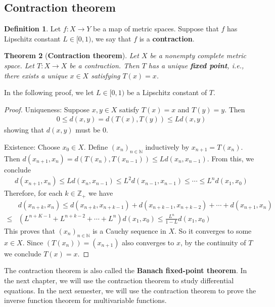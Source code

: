 \documentclass[12pt,b5paper,notitlepage]{article}
\theoremstyle{definition}
\newtheorem{df}{Definition}[section]
\theoremstyle{plain}
\newtheorem{thm}[df]{Theorem}
\newcommand{\Nbb}{\mathbb N}
\newcommand{\Zbb}{\mathbb Z}
\numberwithin{equation}{section}
\begin{document}
\subsection{Contraction theorem}



\begin{df}
Let $f:X\rightarrow Y$ be a map of metric spaces. Suppose that $f$ has Lipschitz constant $L\in[0,1)$, we say that $f$ is a \textbf{contraction}.
\end{df}


\begin{thm}[\textbf{Contraction theorem}] \label{lb555}
Let $X$ be a nonempty complete metric space. Let $T:X\rightarrow X$ be a contraction. Then $T$ has a unique \textbf{fixed point},  i.e., there exists a unique $x\in X$ satisfying $T(x)=x$. 
\end{thm}

In the following proof, we let $L\in[0,1)$ be a Lipschitz constant of $T$.

\begin{proof}
Uniqueness: Suppose $x,y\in X$ satisfy $T(x)=x$ and $T(y)=y$. Then
\begin{align*}
0\leq d(x,y)=d(T(x),T(y))\leq Ld(x,y)
\end{align*}
showing that $d(x,y)$ must be $0$.

Existence: Choose $x_0\in X$. Define $(x_n)_{n\in\Nbb}$ inductively by $x_{n+1}=T(x_n)$. Then $d(x_{n+1},x_n)=d(T(x_n),T(x_{n-1}))\leq L d(x_n,x_{n-1})$. From this, we conclude
\begin{align*}
d(x_{n+1},x_n)\leq Ld(x_n,x_{n-1})\leq L^2 d(x_{n-1},x_{n-1})\leq\cdots\leq L^n d(x_1,x_0)
\end{align*}
Therefore, for each $k\in\Zbb_+$ we have
\begin{align*}
&d(x_{n+k},x_n)\leq d(x_{n+k},x_{n+k-1})+d(x_{n+k-1},x_{n+k-2})+\cdots+d(x_{n+1},x_n)\\
\leq& (L^{n+K-1}+L^{n+k-2}+\cdots+L^n)d(x_1,x_0)\leq \frac {L^n}{1-L}d(x_1,x_0)
\end{align*}
This proves that $(x_n)_{n\in\Nbb}$ is a Cauchy sequence in $X$. So it converges to some $x\in X$. Since $(T(x_n))=(x_{n+1})$ also converges to $x$, by the continuity of $T$ we conclude $T(x)=x$.
\end{proof}


The contraction theorem is also called the \textbf{Banach fixed-point theorem}. In the next chapter, we will use the contraction theorem to study differential equations. In the next semester, we will use the contraction theorem to prove the inverse function theorem for multivariable functions.
\end{document}
